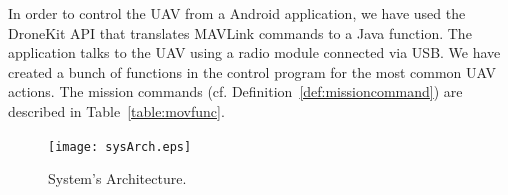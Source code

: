 \documentclass[12pt]{article}
\begin{document}
In order to control the UAV from a Android application, we have used the DroneKit API that translates MAVLink commands to a Java function. The application talks to the UAV using a radio module connected via USB. We have created a bunch of functions in the control program for the most common UAV actions. The mission commands (cf. Definition~\ref{def:missioncommand}) are described in Table~\ref{table:movfunc}.
%

\begin{table}[H]
\scriptsize
\centering
{}
\caption{Description of movement functions}
\label{table:movfunc}
\end{table}


\begin{figure}[H]
	\centering
	\texttt{[image: sysArch.eps]}
	\caption{System's Architecture.\label{fig:sysArch}}
\end{figure}
\end{document}
